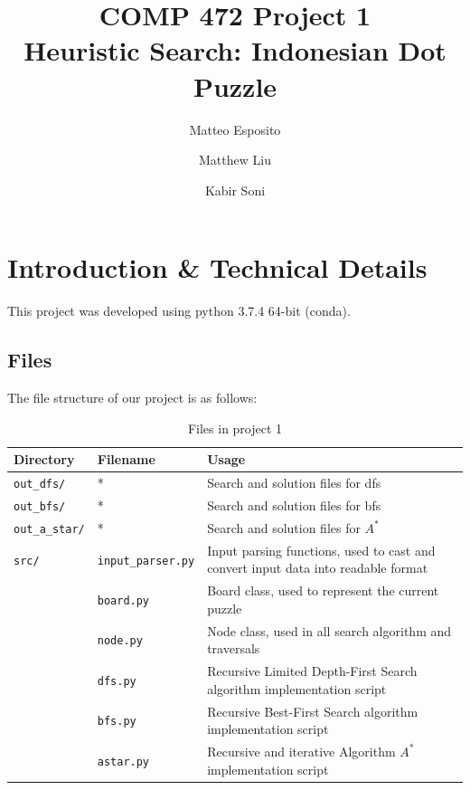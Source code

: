 \documentclass[runningheads]{llncs}
\begin{document}
\title{COMP 472 Project 1 \\ Heuristic Search: Indonesian Dot Puzzle}

\author{Matteo Esposito \and
Matthew Liu \and
Kabir Soni}



\maketitle   

\section{Introduction \& Technical Details}

This project was developed using python 3.7.4 64-bit (conda).

\subsection{Files}

The file structure of our project is as follows:

\begin{table}
    \centering
    \caption{Files in project 1}\label{tab0}
    \begin{tabularx}{\textwidth}{|l|l|X|}
        \hline
        \textbf{Directory} & \textbf{Filename} & \textbf{Usage} \\ \hline
        \verb|out_dfs/| & * & Search and solution files for dfs \\ \hline
        \verb|out_bfs/| & * & Search and solution files for bfs \\ \hline
        \verb|out_a_star/| & * & Search and solution files for $A^{*}$ \\ \hline
        \verb|src/| & \verb|input_parser.py| & Input parsing functions, used to cast and convert input data into readable format \\ \hline
        & \verb|board.py| & Board class, used to represent the current puzzle\\ \hline
        & \verb|node.py| & Node class, used in all search algorithm and traversals \\ \hline
        & \verb|dfs.py| & Recursive Limited Depth-First Search algorithm implementation script \\ \hline
        & \verb|bfs.py| & Recursive Best-First Search algorithm implementation script \\ \hline
        & \verb|astar.py| & Recursive and iterative Algorithm $A^{*}$ implementation script \\ \hline
    \end{tabularx}
\end{table}
\end{document}
